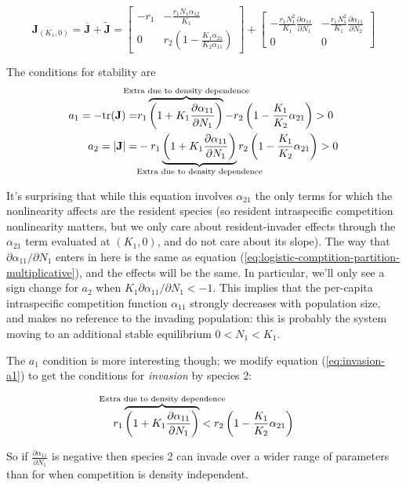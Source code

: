 \documentclass[12pt,a4paper]{article}
\newcommand{\tr}{\mathrm{tr}}
\begin{document}
\begin{equation}
  \mathbf{J}_{(K_1, 0)} = 
  \overline{\mathbf{J}} + \widetilde{\mathbf{J}} = 
  \begin{bmatrix}
    -r_1&
    -\frac{r_1N_1\alpha_{12}}{K_1}\\
    0&
    r_2\left(1  - \frac{K_1\alpha_{21}}{K_2\alpha_{11}}\right)
  \end{bmatrix}
  +
  \begin{bmatrix}
    -\frac{r_1 N_1^2}{K_1} \frac{\partial \alpha_{11}}{\partial N_1}
    &
    -\frac{r_1 N_1^2}{K_1} \frac{\partial \alpha_{11}}{\partial N_2}
    \\0&0
  \end{bmatrix}
\end{equation}

The conditions for stability are
%
\begin{equation*}
  \begin{split}
    a_1 = - \tr(\mathbf{J}) =& 
    r_1\overbrace{\left(1 +
        K_1 \frac{\partial
          \alpha_{11}}{\partial N_1}
      \right)}^{\mathclap{\text{Extra due to density dependence}}} -
    r_2\left(1  - \frac{K_1}{K_2}\alpha_{21}\right)
    > 0\\
    a_2 = |\mathbf{J}| =&
    -r_1\underbrace{\left(1 + K_1
        \frac{\partial \alpha_{11}}{\partial N_1}\right)}%
    _{\mathclap{\text{Extra due to density dependence}}}
    r_2\left(1  - \frac{K_1}{K_2}\alpha_{21}\right)
    > 0
  \end{split}
\end{equation*}

It's surprising that while this equation involves $\alpha_{21}$ the
only terms for which the nonlinearity affects are the resident species
(so resident intraspecific competition nonlinearity matters, but we
only care about resident-invader effects through the $\alpha_{21}$
term evaluated at $(K_1, 0)$, and do not care about its slope).  The
way that $\partial\alpha_{11}/\partial N_1$ enters in here is the same
as equation (\ref{eq:logistic-comptition-partition-multiplicative}),
and the effects will be the same.  In particular, we'll only see a
sign change for $a_2$ when $K_1\partial\alpha_{11}/\partial N_1 < -1$.
This implies that the per-capita intraspecific competition function
$\alpha_{11}$ strongly decreases with population size, and makes no
reference to the invading population: this is probably the system
moving to an additional stable equilibrium $0 < N_1 < K_1$.

The $a_1$ condition is more interesting though; we modify equation
(\ref{eq:invasion-a1}) to get the conditions for \textit{invasion} by
species 2:

\begin{equation}
  \label{eq:invasion-a1}
  r_1\overbrace{\left(1 +
      K_1 \frac{\partial \alpha_{11}}{\partial N_1}
    \right)}^{\mathclap{\text{Extra due to density dependence}}} < r_2\left(1  - \frac{K_1}{K_2}\alpha_{21}\right)  
\end{equation}

So if $\frac{\partial \alpha_{11}}{\partial N_1}$ is negative then
species 2 can invade over a wider range of parameters than for when
competition is density independent.
\end{document}
